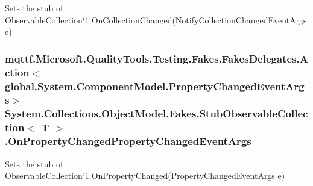 Sets the stub of Observable\-Collection`1.On\-Collection\-Changed(\-Notify\-Collection\-Changed\-Event\-Args e)

\hypertarget{class_system_1_1_collections_1_1_object_model_1_1_fakes_1_1_stub_observable_collection_3_01_t_01_4_a1645eb000c3f84647ccb69474e48811d}{
\subsubsection[{On\-Property\-Changed\-Property\-Changed\-Event\-Args}]{\setlength{\rightskip}{0pt plus 5cm}mqttf.\-Microsoft.\-Quality\-Tools.\-Testing.\-Fakes.\-Fakes\-Delegates.\-Action$<$global.\-System.\-Component\-Model.\-Property\-Changed\-Event\-Args$>$ System.\-Collections.\-Object\-Model.\-Fakes.\-Stub\-Observable\-Collection$<$ T $>$.On\-Property\-Changed\-Property\-Changed\-Event\-Args}}\label{class_system_1_1_collections_1_1_object_model_1_1_fakes_1_1_stub_observable_collection_3_01_t_01_4_a1645eb000c3f84647ccb69474e48811d}


Sets the stub of Observable\-Collection`1.On\-Property\-Changed(\-Property\-Changed\-Event\-Args e)

